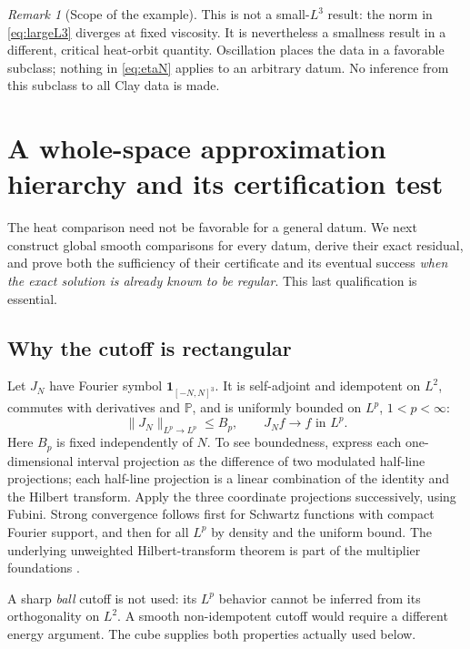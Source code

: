 \documentclass[11pt,a4paper]{article}
\theoremstyle{definition}\newtheorem{definition}[theorem]{Definition}
\theoremstyle{remark}\newtheorem{remark}[theorem]{Remark}
\newcommand{\PP}{\mathbb P}
\newcommand{\norm}[1]{\lVert #1\rVert}
\numberwithin{equation}{section}
\begin{document}
\begin{remark}[Scope of the example]
This is not a small-$L^3$ result: the norm in \eqref{eq:largeL3} diverges at fixed viscosity. It is nevertheless a smallness result in a different, critical heat-orbit quantity. Oscillation places the data in a favorable subclass; nothing in \eqref{eq:etaN} applies to an arbitrary datum. No inference from this subclass to all Clay data is made.
\end{remark}

\section{A whole-space approximation hierarchy and its certification test}
\label{sec:hierarchy}
The heat comparison need not be favorable for a general datum. We next construct global smooth comparisons for every datum, derive their exact residual, and prove both the sufficiency of their certificate and its eventual success \emph{when the exact solution is already known to be regular}. This last qualification is essential.

\subsection{Why the cutoff is rectangular}
Let $J_N$ have Fourier symbol $\mathbf1_{[-N,N]^3}$. It is self-adjoint and idempotent on $L^2$, commutes with derivatives and $\PP$, and is uniformly bounded on $L^p$, $1<p<\infty$:
\begin{equation}\label{eq:Jbounds}
 \norm{J_N}_{L^p\to L^p}\le B_p,
 \qquad J_Nf\longrightarrow f\text{ in }L^p.
\end{equation}
Here $B_p$ is fixed independently of $N$. To see boundedness, express each one-dimensional interval projection as the difference of two modulated half-line projections; each half-line projection is a linear combination of the identity and the Hilbert transform. Apply the three coordinate projections successively, using Fubini. Strong convergence follows first for Schwartz functions with compact Fourier support, and then for all $L^p$ by density and the uniform bound. The underlying unweighted Hilbert-transform theorem is part of the multiplier foundations \cite{Stein}.

A sharp \emph{ball} cutoff is not used: its $L^p$ behavior cannot be inferred from its orthogonality on $L^2$. A smooth non-idempotent cutoff would require a different energy argument. The cube supplies both properties actually used below.
\end{document}
